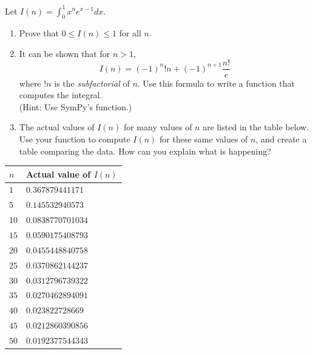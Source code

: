 \begin{problem} %
Let $I(n) = \int_0^1 x^n e^{x - 1} dx$.
\begin{enumerate}
\item Prove that $0 \leq I(n) \leq 1$ for all $n$.
\item It can be shown that for $n>1$,
\[
I(n) = \left(-1\right)^{n} !n + \left(-1\right)^{n + 1} \frac{n!}{e}
\]
where $!n$ is the \emph{subfactorial} of $n$.
Use this formula to write a function that computes the integral.
\\ (Hint: Use SymPy's  function.)
\item The actual values of $I(n)$ for many values of $n$ are listed in the table below.
Use your function  to compute $I(n)$ for these same values of $n$, and create a table comparing the data.
How can you explain what is happening?
\end{enumerate}

\begin{center}
\begin{tabular}{|l|l|}
\hline
$n$  & Actual value of $I(n)$ \\
\hline
$1$  & $0.367879441171$ \\
$5$  & $0.145532940573$ \\
$10$ & $0.0838770701034$ \\
$15$ & $0.0590175408793$ \\
$20$ & $0.0455448840758$ \\
$25$ & $0.0370862144237$ \\
$30$ & $0.0312796739322$ \\
$35$ & $0.0270462894091$ \\
$40$ & $0.023822728669$ \\
$45$ & $0.0212860390856$ \\
$50$ & $0.0192377544343$ \\
\hline
\end{tabular}
\end{center}
\end{problem}

